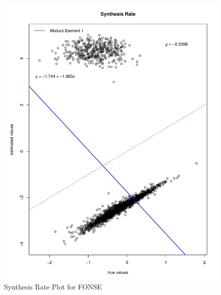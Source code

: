 \documentclass[11pt]{labbook}
\begin{document}
    \begin{figure}
        \centering
        \includegraphics[scale=.65]{FONSE_Plots/2016/July_27/SynthesisRateComp}
        \caption{Synthesis Rate Plot for FONSE}
        \label{fig:JULY27_SYNTH}
    \end{figure}
\end{document}
